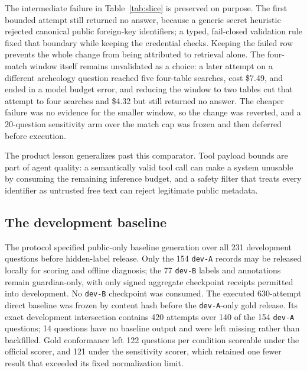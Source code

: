 The intermediate failure in Table~\ref{tab:slice} is preserved on purpose. The
first bounded attempt still returned no answer, because a generic secret
heuristic rejected canonical public foreign-key identifiers; a typed, fail-closed
validation rule fixed that boundary while keeping the credential checks. Keeping
the failed row prevents the whole change from being attributed to retrieval
alone. The four-match window itself remains unvalidated as a choice: a later
attempt on a different archeology question reached five four-table searches, cost
\$7.49, and ended in a model budget error, and reducing the window to two tables
cut that attempt to four searches and \$4.32 but still returned no answer. The
cheaper failure was no evidence for the smaller window, so the change was
reverted, and a 20-question sensitivity arm over the match cap was frozen and
then deferred before execution.

The product lesson generalizes past this comparator. Tool payload bounds are part
of agent quality: a semantically valid tool call can make a system unusable by
consuming the remaining inference budget, and a safety filter that treats every
identifier as untrusted free text can reject legitimate public metadata.

\subsection{The development baseline}

The protocol specified public-only baseline generation over all 231 development
questions before hidden-label release. Only the 154 \texttt{dev-A} records may
be released locally for scoring and offline diagnosis; the 77 \texttt{dev-B}
labels and annotations remain guardian-only, with only signed aggregate
checkpoint receipts permitted into development. No \texttt{dev-B} checkpoint
was consumed. The executed 630-attempt direct baseline was frozen by content
hash before the \texttt{dev-A}-only gold release. Its exact development
intersection contains 420 attempts over 140 of the 154 \texttt{dev-A} questions; 14 questions have no baseline output and were
left missing rather than backfilled. Gold conformance left 122 questions per
condition scoreable under the official scorer, and 121 under the sensitivity
scorer, which retained one fewer result that exceeded its fixed normalization
limit.

